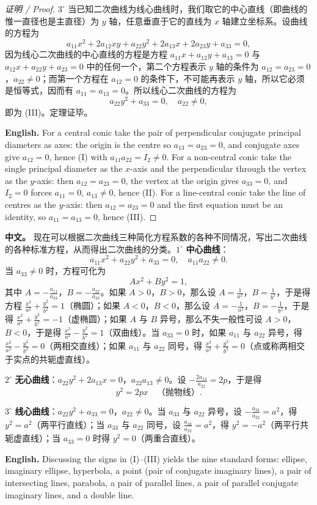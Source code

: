 \documentclass[UTF8,11pt,a4paper]{ctexart}
\newcommand{\APS}[2]{\par\noindent\textbf{中文。} #1\par\noindent\textbf{English.} #2\par\smallskip}
\newcommand{\EN}[1]{\par\noindent \textbf{English.} #1\par}
\theoremstyle{definition}
\begin{document}
\begin{proof}[证明 / Proof]
$3^\circ$ 当已知二次曲线为线心曲线时，我们取它的中心直线（即曲线的惟一直径也是主直径）为 $y$ 轴，任意垂直于它的直线为 $x$ 轴建立坐标系。设曲线的方程为
\[
a_{11}x^2+2a_{12}xy+a_{22}y^2+2a_{13}x+2a_{23}y+a_{33}=0,
\]
因为线心二次曲线的中心直线的方程是方程 $a_{11}x+a_{12}y+a_{13}=0$ 与 $a_{12}x+a_{22}y+a_{23}=0$ 中的任何一个，第二个方程表示 $y$ 轴的条件为 $a_{12}=a_{23}=0$，$a_{22}\ne0$；而第一个方程在 $a_{12}=0$ 的条件下，不可能再表示 $y$ 轴，所以它必须是恒等式，因而有 $a_{11}=a_{13}=0$。所以线心二次曲线的方程为
\[
a_{22}y^2+a_{33}=0,\quad a_{22}\ne0,
\]
即为 (III)。定理证毕。
\EN{For a central conic take the pair of perpendicular conjugate principal diameters as axes: the origin is the centre so $a_{13}=a_{23}=0$, and conjugate axes give $a_{12}=0$, hence (I) with $a_{11}a_{22}=I_2\ne0$. For a non-central conic take the single principal diameter as the $x$-axis and the perpendicular through the vertex as the $y$-axis: then $a_{12}=a_{23}=0$, the vertex at the origin gives $a_{33}=0$, and $I_2=0$ forces $a_{11}=0$, $a_{13}\ne0$, hence (II). For a line-central conic take the line of centres as the $y$-axis: then $a_{12}=a_{23}=0$ and the first equation must be an identity, so $a_{11}=a_{13}=0$, hence (III).}
\end{proof}

\APS{现在可以根据二次曲线三种简化方程系数的各种不同情况，写出二次曲线的各种标准方程，从而得出二次曲线的分类。$1^\circ$ \textbf{中心曲线}：
\[
a_{11}x^2+a_{22}y^2+a_{33}=0,\quad a_{11}a_{22}\ne0.
\]
当 $a_{33}\ne0$ 时，方程可化为
\[
Ax^2+By^2=1,
\]
其中 $A=-\frac{a_{11}}{a_{33}}$，$B=-\frac{a_{22}}{a_{33}}$。如果 $A>0$，$B>0$，那么设 $A=\frac1{a^2}$，$B=\frac1{b^2}$，于是得方程 $\frac{x^2}{a^2}+\frac{y^2}{b^2}=1$（椭圆）；如果 $A<0$，$B<0$，那么设 $A=-\frac1{a^2}$，$B=-\frac1{b^2}$，于是得 $\frac{x^2}{a^2}+\frac{y^2}{b^2}=-1$（虚椭圆）；如果 $A$ 与 $B$ 异号，那么不失一般性可设 $A>0$，$B<0$，于是得 $\frac{x^2}{a^2}-\frac{y^2}{b^2}=1$（双曲线）。当 $a_{33}=0$ 时，如果 $a_{11}$ 与 $a_{22}$ 异号，得 $\frac{x^2}{a^2}-\frac{y^2}{b^2}=0$（两相交直线）；如果 $a_{11}$ 与 $a_{22}$ 同号，得 $\frac{x^2}{a^2}+\frac{y^2}{b^2}=0$（点或称两相交于实点的共轭虚直线）。

$2^\circ$ \textbf{无心曲线}：$a_{22}y^2+2a_{13}x=0$，$a_{22}a_{13}\ne0$。设 $-\frac{2a_{13}}{a_{22}}=2p$，于是得
\[
y^2=2px\quad\text{（抛物线）}.
\]

$3^\circ$ \textbf{线心曲线}：$a_{22}y^2+a_{33}=0$，$a_{22}\ne0$。当 $a_{33}$ 与 $a_{22}$ 异号，设 $-\frac{a_{33}}{a_{22}}=a^2$，得 $y^2=a^2$（两平行直线）；当 $a_{33}$ 与 $a_{22}$ 同号，设 $\frac{a_{33}}{a_{22}}=a^2$，得 $y^2=-a^2$（两平行共轭虚直线）；当 $a_{33}=0$ 时得 $y^2=0$（两重合直线）。}{Discussing the signs in (I)--(III) yields the nine standard forms: ellipse, imaginary ellipse, hyperbola, a point (pair of conjugate imaginary lines), a pair of intersecting lines, parabola, a pair of parallel lines, a pair of parallel conjugate imaginary lines, and a double line.}
\end{document}
